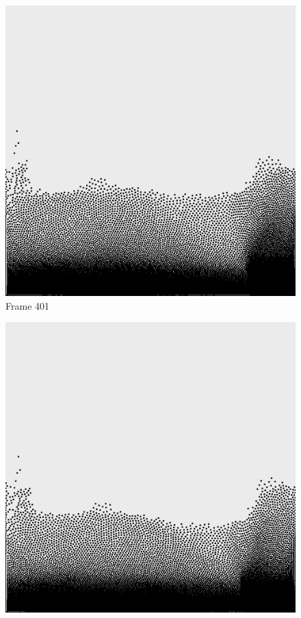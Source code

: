 \documentclass[a4paper, 12pt, oneside]{book}
\begin{document}
\begin{figure}[!ht]
        \begin{center}
            \includegraphics[width=\linewidth]{images/test_case_2/401.png}
            Frame 401
        \end{center}
    \endminipage
    \hfill
        \begin{center}
            \includegraphics[width=\linewidth]{images/test_case_2/421.png}

\end{center}
\end{figure}
\end{document}
